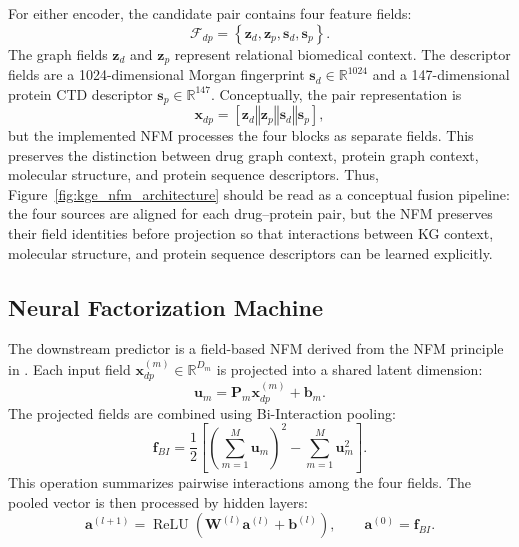 For either encoder, the candidate pair contains four feature fields:
\begin{equation}
    \mathcal{F}_{dp}
    =
    \left\{
        \mathbf{z}_{d},
        \mathbf{z}_{p},
        \mathbf{s}_{d},
        \mathbf{s}_{p}
    \right\}.
    \label{eq:kge_nfm_fields}
\end{equation}
The graph fields $\mathbf{z}_{d}$ and $\mathbf{z}_{p}$ represent relational biomedical context. The descriptor fields are a 1024-dimensional Morgan fingerprint $\mathbf{s}_{d}\in\mathbb{R}^{1024}$ and a 147-dimensional protein CTD descriptor $\mathbf{s}_{p}\in\mathbb{R}^{147}$. Conceptually, the pair representation is
\begin{equation}
    \mathbf{x}_{dp}
    =
    [
        \mathbf{z}_{d}
        \mathbin{\Vert}
        \mathbf{z}_{p}
        \mathbin{\Vert}
        \mathbf{s}_{d}
        \mathbin{\Vert}
        \mathbf{s}_{p}
    ],
\end{equation}
but the implemented NFM processes the four blocks as separate fields. This preserves the distinction between drug graph context, protein graph context, molecular structure, and protein sequence descriptors.
Thus, Figure~\ref{fig:kge_nfm_architecture} should be read as a conceptual fusion pipeline: the four sources are aligned for each drug--protein pair, but the NFM preserves their field identities before projection so that interactions between KG context, molecular structure, and protein sequence descriptors can be learned explicitly.

\subsection{Neural Factorization Machine}

The downstream predictor is a field-based NFM derived from the NFM principle in \cite{0001C17}. Each input field $\mathbf{x}_{dp}^{(m)}\in\mathbb{R}^{D_m}$ is projected into a shared latent dimension:
\begin{equation}
    \mathbf{u}_{m}
    =
    \mathbf{P}_{m}\mathbf{x}_{dp}^{(m)}+\mathbf{b}_{m}.
    \label{eq:nfm_field_projection}
\end{equation}
The projected fields are combined using Bi-Interaction pooling:
\begin{equation}
    \mathbf{f}_{BI}
    =
    \frac{1}{2}
    \left[
        \left(
            \sum_{m=1}^{M}\mathbf{u}_{m}
        \right)^2
        -
        \sum_{m=1}^{M}\mathbf{u}_{m}^{2}
    \right].
    \label{eq:nfm_bi_interaction}
\end{equation}
This operation summarizes pairwise interactions among the four fields. The pooled vector is then processed by hidden layers:
\begin{equation}
    \mathbf{a}^{(l+1)}
    =
    \operatorname{ReLU}
    \left(
        \mathbf{W}^{(l)}\mathbf{a}^{(l)}+\mathbf{b}^{(l)}
    \right),
    \qquad
    \mathbf{a}^{(0)}=\mathbf{f}_{BI}.
\end{equation}

